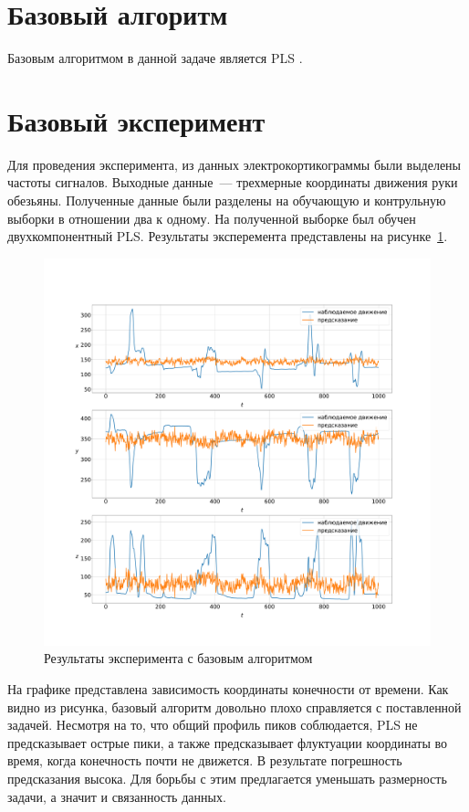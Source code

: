 \section{Базовый алгоритм}
Базовым алгоритмом в данной задаче является PLS \cite{Haenlein2004}.

\section{Базовый эксперимент}
Для проведения эксперимента, из данных электрокортикограммы были выделены частоты сигналов. Выходные данные~--- трехмерные координаты движения руки обезьяны. Полученные данные были разделены на обучающую и контрульную выборки в отношении два к одному. На полученной выборке был обучен двухкомпонентный PLS. Результаты эксперемента представлены на рисунке~\ref{fig:baseAlgo}.
\begin{figure}
  \begin{center}
    \includegraphics[width=\textwidth]{pls.pdf}
    \caption{Результаты эксперимента с базовым алгоритмом}
    \label{fig:baseAlgo}
  \end{center}
\end{figure}
На графике представлена зависимость координаты конечности от времени. Как видно из рисунка, базовый алгоритм довольно плохо справляется с поставленной задачей. Несмотря на то, что общий профиль пиков соблюдается, PLS не предсказывает острые пики, а также предсказывает флуктуации координаты во время, когда конечность почти не движется. В результате погрешность предсказания высока. Для борьбы с этим предлагается уменьшать размерность задачи, а значит и связанность данных.

